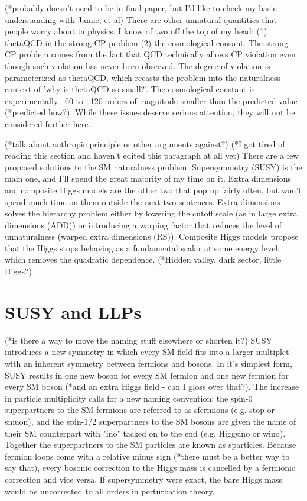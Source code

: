 \documentclass[12pt]{article}
\begin{document}
    (*probably doesn't need to be in final paper, but I'd like to check my basic understanding with Jamie, et al)
    There are other unnatural quantities that people worry about in physics. I know of two off the top of my head: (1) thetaQCD in the strong CP problem (2) the cosmological consant. The strong CP problem comes from the fact that QCD technically allows CP violation even though such violation has never been observed. The degree of violation is parameterized as thetaQCD, which recasts the problem into the naturalness context of 'why is thetaQCD so small?'. The cosmological constant is experimentally ~60 to ~120 orders of magnitude smaller than the predicted value (*predicted how?). While these issues deserve serious attention, they will not be considered further here.
    
    (*talk about anthropic principle or other arguments against?)
    (*I got tired of reading this section and haven't edited this paragraph at all yet)
    There are a few proposed solutions to the SM naturalness problem. Supersymmetry (SUSY) is the main one, and I'll spend the great majority of my time on it. Extra dimensions and composite Higgs models are the other two that pop up fairly often, but won't spend much time on them outside the next two sentences. Extra dimensions solves the hierarchy problem either by lowering the cutoff scale (as in large extra dimensions (ADD)) or introducing a warping factor that reduces the level of unnaturalness (warped extra dimensions (RS)). Composite Higgs models propose that the Higgs stops behaving as a fundamental scalar at some energy level, which removes the quadratic dependence. (*Hidden valley, dark sector, little Higgs?)
    
\section{SUSY and LLPs}
    (*is there a way to move the naming stuff elsewhere or shorten it?)
    SUSY introduces a new symmetry in which every SM field fits into a larger multiplet with an inherent symmetry between fermions and bosons. In it's simplest form, SUSY results in one new boson for every SM fermion and one new fermion for every SM boson (*and an extra Higgs field - can I gloss over that?). The increase in particle multiplicity calls for a new naming convention: the spin-0 superpartners to the SM fermions are referred to as sfermions (e.g. stop or smuon), and the spin-1/2 superpartners to the SM bosons are given the name of their SM counterpart with "ino" tacked on to the end (e.g. Higgsino or wino). Together the superpartners to the SM particles are known as sparticles. Because fermion loops come with a relative minus sign (*there must be a better way to say that), every bosonic correction to the Higgs mass is cancelled by a fermionic correction and vice versa. If supersymmetry were exact, the bare Higgs mass would be uncorrected to all orders in perturbation theory.
\end{document}

